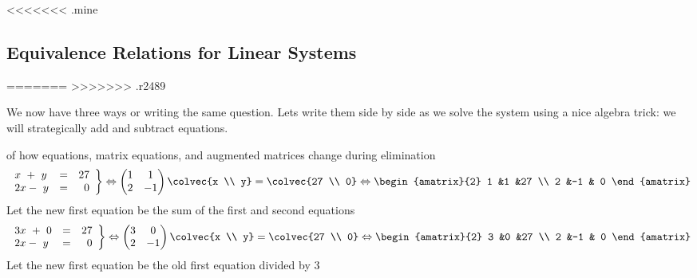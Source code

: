 <<<<<<< .mine
\subsection*{Equivalence Relations for Linear Systems}
=======
>>>>>>> .r2489

We now have three ways or writing the same question. 
Lets write them side by side as we solve the system using a nice algebra trick: we will strategically add and subtract  equations.

\begin{example} of how equations, matrix equations, and augmented matrices change during elimination
\begin{eqnarray*}
   \left.
\begin{array}{lcr}
	x\ +\ y & = & 27 \\
	2x-\ y & = &\  0 
     \end{array}
   \right\} 
   \Leftrightarrow
    \begin{pmatrix}
      1             &1  \\
      2             &-1
    \end{pmatrix}
  \colvec{x \\ y}
  =
  \colvec{27 \\ 0}
  \Leftrightarrow
 \begin{amatrix}{2}
1 &1 &27 \\ 2 &-1 & 0
\end{amatrix}
  \end{eqnarray*}
Let the new first equation be the sum of the first and second equations
\begin{eqnarray*}
   \left.
\begin{array}{lcr}
	3x\ +\ 0 & = & 27 \\
	2x-\ y & = &\  0 
     \end{array}
   \right\} 
   \Leftrightarrow
    \begin{pmatrix}
      3             &0  \\
      2             &-1
    \end{pmatrix}
  \colvec{x \\ y}
  =
  \colvec{27 \\ 0}
  \Leftrightarrow
 \begin{amatrix}{2}
3 &0 &27 \\ 2 &-1 & 0
\end{amatrix}
  \end{eqnarray*}
Let the new first equation be the old first equation divided by 3
 \begin{eqnarray*}

\end{eqnarray*}
\end{example}
